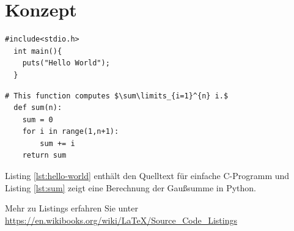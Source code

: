 \chapter{Konzept}\label{chap:concept}

\lstset{language=C} 
\begin{lstlisting}[caption=Hello World in C., label=lst:hello-world]
  #include<stdio.h>
  int main(){
    puts("Hello World");
  }
\end{lstlisting}

\lstset{language=python,mathescape=true} %
\begin{lstlisting}[caption=Summenfunktion.,label=lst:sum]
  # This function computes $\sum\limits_{i=1}^{n} i.$
  def sum(n):
    sum = 0
    for i in range(1,n+1):
        sum += i
    return sum 
\end{lstlisting}

Listing \ref{lst:hello-world} enthält den Quelltext für einfache
C-Programm und Listing \ref{lst:sum} zeigt eine Berechnung der
Gaußsumme in Python. 


Mehr zu Listings erfahren Sie unter 
\url{https://en.wikibooks.org/wiki/LaTeX/Source_Code_Listings}

